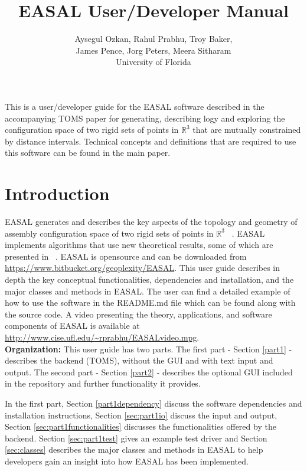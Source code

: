\documentclass[10pt]{article}
\title{EASAL User/Developer Manual}
\author{Aysegul Ozkan, Rahul Prabhu, Troy Baker, \\James Pence, Jorg
Peters, Meera Sitharam \\ University of Florida}
\begin{document}
\maketitle
This is a user/developer guide for the EASAL software described in the 
accompanying TOMS paper for generating, describing logy and exploring the 
configuration space of two rigid sets of points in $\mathbb{R}^3$ that are mutually 
constrained by distance intervals. Technical concepts and definitions that are 
required to use this software can be found in the main paper.


\section{Introduction}
EASAL generates and describes the key aspects of the topology and geometry of
assembly configuration space of two rigid sets of points in $\mathbb{R}^3$
~\cite{Sitharam:2012:EASAL, Ozkan2014MainEasal, Wu2014Virus}. EASAL implements
algorithms that use new theoretical results, some of which are presented in
~\cite{Ozkan2014MainEasal, SiGa:2010, Sitharam:2012:EASAL}.
EASAL is opensource and can be downloaded from
\url{https://www.bitbucket.org/geoplexity/EASAL}. This user guide describes in
depth the key conceptual functionalities, dependencies and installation, and
the major classes and methods in EASAL.  The user can find a detailed example
of how to use the software in the README.md file which can be found along with
the source code. A video presenting the theory, applications, and software
components of EASAL is available at
\url{http://www.cise.ufl.edu/~rprabhu/EASALvideo.mpg}.\\

\noindent\textbf{Organization:} 
This user guide has two parts. The first part - Section \ref{part1} - describes
the backend (TOMS), without the GUI and with text input and output. The second
part - Section \ref{part2} - describes the optional GUI included in the
repository and further functionality it provides.


In the first part, Section \ref{part1dependency} discuss the software
dependencies and installation instructions, Section \ref{sec:part1io} discuss
the input and output, Section \ref{sec:part1functionalities} discusses the
functionalities offered by the backend. Section \ref{sec:part1test} gives an
example test driver and Section \ref{sec:classes} describes the major classes
and methods in EASAL to help developers gain an insight into how EASAL has been
implemented.
\end{document}
